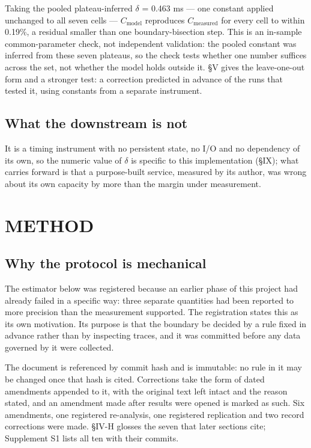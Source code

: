\documentclass{ieeeaccess}
\begin{document}
Taking the pooled plateau-inferred $\delta$ = 0.463 ms --- one constant applied unchanged to all seven cells --- $C_{\mathrm{model}}$ reproduces $C_{\mathrm{measured}}$ for every cell to within 0.19\%, a residual smaller than one boundary-bisection step. This is an in-sample common-parameter check, not independent validation: the pooled constant was inferred from these seven plateaus, so the check tests whether one number suffices across the set, not whether the model holds outside it. \S{}V gives the leave-one-out form and a stronger test: a correction predicted in advance of the runs that tested it, using constants from a separate instrument.

\subsection{What the downstream is not}

It is a timing instrument with no persistent state, no I/O and no dependency of its own, so the numeric value of $\delta$ is specific to this implementation (\S{}IX); what carries forward is that a purpose-built service, measured by its author, was wrong about its own capacity by more than the margin under measurement.

\section{METHOD}

\subsection{Why the protocol is mechanical}

The estimator below was registered because an earlier phase of this project had already failed in a specific way: three separate quantities had been reported to more precision than the measurement supported. The registration states this as its own motivation. Its purpose is that the boundary be decided by a rule fixed in advance rather than by inspecting traces, and it was committed before any data governed by it were collected.

The document is referenced by commit hash and is immutable: no rule in it may be changed once that hash is cited. Corrections take the form of dated amendments appended to it, with the original text left intact and the reason stated, and an amendment made after results were opened is marked as such. Six amendments, one registered re-analysis, one registered replication and two record corrections were made. \S{}IV-H glosses the seven that later sections cite; Supplement S1 lists all ten with their commits.
\end{document}
